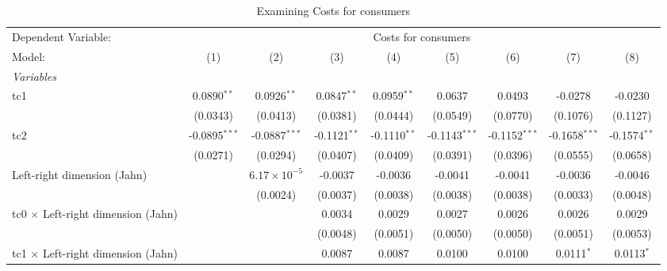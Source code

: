 
\begin{table}[htbp]
   \caption{Examining Costs for consumers}
   \centering
   \begin{tabular}{lcccccccc}
      \tabularnewline \midrule \midrule
      Dependent Variable: & \multicolumn{8}{c}{Costs for consumers}\\
      Model:                                    & (1)             & (2)                   & (3)            & (4)            & (5)             & (6)             & (7)             & (8)\\  
      \midrule
      \emph{Variables}\\
      tc1                                       & 0.0890$^{**}$   & 0.0926$^{**}$         & 0.0847$^{**}$  & 0.0959$^{**}$  & 0.0637          & 0.0493          & -0.0278         & -0.0230\\   
                                                & (0.0343)        & (0.0413)              & (0.0381)       & (0.0444)       & (0.0549)        & (0.0770)        & (0.1076)        & (0.1127)\\   
      tc2                                       & -0.0895$^{***}$ & -0.0887$^{***}$       & -0.1121$^{**}$ & -0.1110$^{**}$ & -0.1143$^{***}$ & -0.1152$^{***}$ & -0.1658$^{***}$ & -0.1574$^{**}$\\   
                                                & (0.0271)        & (0.0294)              & (0.0407)       & (0.0409)       & (0.0391)        & (0.0396)        & (0.0555)        & (0.0658)\\   
      Left-right dimension (Jahn)               &                 & $6.17\times 10^{-5}$  & -0.0037        & -0.0036        & -0.0041         & -0.0041         & -0.0036         & -0.0046\\   
                                                &                 & (0.0024)              & (0.0037)       & (0.0038)       & (0.0038)        & (0.0038)        & (0.0033)        & (0.0048)\\   
      tc0 $\times$ Left-right dimension (Jahn)  &                 &                       & 0.0034         & 0.0029         & 0.0027          & 0.0026          & 0.0026          & 0.0029\\   
                                                &                 &                       & (0.0048)       & (0.0051)       & (0.0050)        & (0.0050)        & (0.0051)        & (0.0053)\\   
      tc1 $\times$ Left-right dimension (Jahn)  &                 &                       & 0.0087         & 0.0087         & 0.0100          & 0.0100          & 0.0111$^{*}$    & 0.0113$^{*}$\\   

\end{tabular}
\end{table}
